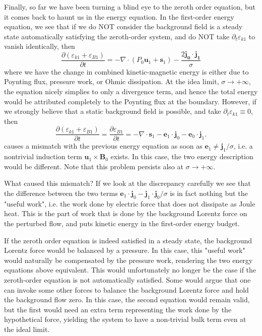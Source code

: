Finally, so far we have been turning a blind eye to the zeroth order equation, but it comes back to haunt us in the energy equation. In the first-order energy equation, we see that if we do NOT consider the background field is a steady state automatically satisfying the zeroth-order system, and do NOT take $\partial_t \varepsilon_{k1}$ to vanish identically, then
%
\[
    \frac{\partial (\varepsilon_{k1} + \varepsilon_{B1})}{\partial t} = - \nabla\cdot (P_0 \mathbf{u}_1 + \mathbf{s}_1) - \frac{2\mathbf{j_0\cdot \mathbf{j}_1}}{\sigma}
\]
%
where we have the change in combined kinetic-magnetic energy is either due to Poynting flux, pressure work, or Ohmic dissipation. At the idea limit, $\sigma\rightarrow + \infty$, the equation nicely simplies to only a divergence term, and hence the total energy would be attributed completely to the Poynting flux at the boundary. However, if we strongly believe that a static background field is possible, and take $\partial_t \varepsilon_{k1} \equiv 0$, then
%
\[
    \frac{\partial (\varepsilon_{k1} + \varepsilon_{B1})}{\partial t} = \frac{\partial \varepsilon_{B1}}{\partial t} = - \nabla\cdot \mathbf{s}_1 - \mathbf{e}_1\cdot \mathbf{j}_0 - \mathbf{e}_0\cdot \mathbf{j}_1.
\]
%
causes a mismatch with the previous energy equation as soon as $\mathbf{e}_1\neq \mathbf{j}_1/\sigma$, i.e. a nontrivial induction term $\mathbf{u}_1\times \mathbf{B}_0$ exists. In this case, the two energy description would be different. Note that this problem persists also at $\sigma \rightarrow +\infty$.

What caused this mismatch? If we look at the discrepancy carefully we see that the difference between the two terms $\mathbf{e}_1\cdot \mathbf{j}_0 - \mathbf{j}_1 \cdot \mathbf{j}_0 / \sigma$ is in fact nothing but the "useful work", i.e. the work done by electric force that does not dissipate as Joule heat. This is the part of work that is done by the background Lorentz force on the perturbed flow, and puts kinetic energy in the first-order energy budget.

If the zeroth order equation is indeed satisfied in a steady state, the background Lorentz force would be balanced by a pressure. In this case, this "useful work" would naturally be compensated by the pressure work, rendering the two energy equations above equivalent. This would unfortunately no longer be the case if the zeroth-order equation is not automatically satisfied. Some would argue that one can invoke some other forces to balance the background Lorentz force and hold the background flow zero. In this case, the second equation would remain valid, but the first would need an extra term representing the work done by the hypothetical force, yielding the system to have a non-trivial bulk term even at the ideal limit.

